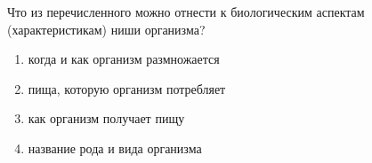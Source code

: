 
Что из перечисленного можно отнести к биологическим аспектам (характеристикам) ниши организма?

\begin{enumerate}
    \item когда и как организм размножается
    \item пища, которую организм потребляет
    \item как организм получает пищу
    \item название рода и вида организма
\end{enumerate}



